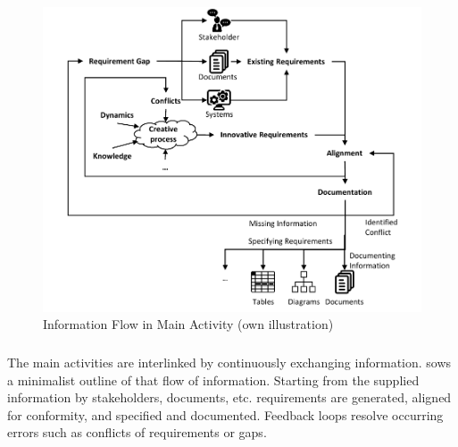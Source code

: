 \begin{figure}[H]
    \centering
    \includegraphics[scale=1]{img/MainActivity.pdf}
    \caption[Information Flow in Main Activity of Requirements Engineering]{Information Flow in Main Activity  (own illustration)}
    \label{fig:infFlow}
\end{figure}
\subparagraph{} The main activities are interlinked by continuously exchanging information.  sows a minimalist outline of that flow of information. Starting from the supplied information by stakeholders, documents, etc. requirements are generated, aligned for conformity, and specified and documented. Feedback loops resolve occurring errors such as conflicts of requirements or gaps.
